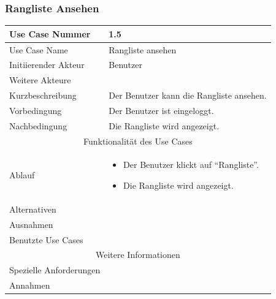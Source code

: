 \documentclass[10pt,a4paper]{article}
\begin{document}
\subsubsection{Rangliste Ansehen}
	\begin{tabular}{|l|p{.5\linewidth}|}
	\hline Use Case Nummer & 1.5 \\ 
	\hline Use Case Name & Rangliste ansehen \\ 
	\hline Initiierender Akteur & Benutzer \\
	\hline Weitere Akteure &  \\
	\hline Kurzbeschreibung & Der Benutzer kann die Rangliste ansehen. \\
	\hline Vorbedingung & Der Benutzer ist eingeloggt. \\
	\hline Nachbedingung & Die Rangliste wird angezeigt. \\
	\hline \multicolumn{2}{|c|}{Funktionalität des Use Cases}\\
	\hline Ablauf & \begin{itemize}
                \item Der Benutzer klickt auf ``Rangliste''. 
                \item Die Rangliste wird angezeigt.
                \end{itemize}\\
	\hline Alternativen & \\
	\hline Ausnahmen &  \\
	\hline Benutzte Use Cases &  \\
	\hline \multicolumn{2}{|c|}{Weitere Informationen} \\
	\hline Spezielle Anforderungen &  \\
	\hline Annahmen &  \\
	\hline
	\end{tabular}
        
\end{document}
